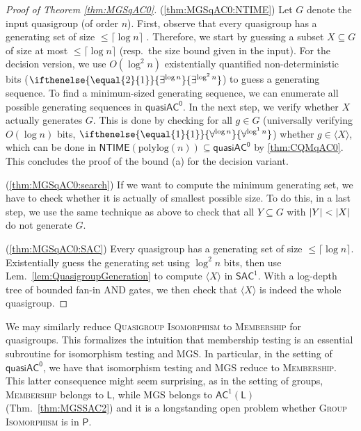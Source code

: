 \documentclass{theoretics}
\newcommand{\algprobm}[1]{\textsc{#1}\xspace}
\newcommand{\betacc}[1]{\ifthenelse{\equal{#1}{1}}{\exists^{\log n}}{\exists^{\log^{#1}n}}} %
\newcommand{\alphacc}[1]{\ifthenelse{\equal{#1}{1}}{\forall^{\log n}}{\forall^{\log^{#1}n}}} %
\newcommand{\abs}[1]{\left|\mathinner{#1}\right|}
\newcommand{\Lem}[1]{Lem.~\ref{#1}\xspace}
\newcommand{\Thm}[1]{Thm.~\ref{#1}\xspace}
\newcommand*{\ComplexityClass}[1]{\ensuremath{\mathsf{#1}}\xspace}
\newcommand*{\LogSpace}{\ComplexityClass{L}}
\newcommand{\SAC}{\ComplexityClass{SAC}}
\newcommand{\qACz}{\ComplexityClass{quasiAC^0}}
\newcommand{\NTIME}{\ComplexityClass{NTIME}}
\begin{document}
\begin{proof}[Proof of Theorem \ref{thm:MGSqAC0}]

(\ref{thm:MGSqAC0:NTIME}) Let $G$ denote the input quasigroup (of order $n$). First, observe that every quasigroup has a generating set of size $\leq \lceil \log n \rceil$ \cite{MillerTarjan}. Therefore, we start by guessing a subset $X\subseteq G$ of size at most $\leq \lceil \log n \rceil$ (resp.\ the size bound given in the input). For the decision version, we use $O(\log^2 n)$ existentially quantified non-deterministic bits ($\betacc{2}$) to guess a generating sequence. To find a minimum-sized generating sequence,  we can enumerate all possible generating sequences in $\qACz$. In the next step, we verify whether $X$ actually generates $G$. This is done by checking for all $g \in G$ (universally verifying $O(\log n)$ bits, $\alphacc{1}$) whether $g \in \langle X \rangle$, which can be done in $\NTIME(\mathrm{polylog}(n)) \subseteq \qACz$ by \cref{thm:CQMqAC0}. This concludes the proof of the bound (a) for the decision variant. 

(\ref{thm:MGSqAC0:search}) If we want to compute the minimum generating set, we have to check whether it is actually of smallest possible size. To do this, in a last step, we use the same technique as above to check that all $Y \subseteq G $ with $\abs{Y} < \abs{X}$ do not generate $G$.

(\ref{thm:MGSqAC0:SAC}) Every quasigroup has a generating set of size $\leq \lceil \log n \rceil$. Existentially guess the generating set using $\log^2 n$ bits, then use \Lem{lem:QuasigroupGeneration} to compute $\langle X \rangle$ in $\SAC^1$. With a log-depth tree of bounded fan-in AND gates, we then check that $\langle X \rangle$ is indeed the whole quasigroup. 
\end{proof}



\begin{remark}
We may similarly reduce \algprobm{Quasigroup Isomorphism} to \algprobm{Membership} for quasigroups. This formalizes the intuition that membership testing is an essential subroutine for isomorphism testing and \algprobm{MGS}. In particular, in the setting of $\qACz$, we have that isomorphism testing and \algprobm{MGS} reduce to \algprobm{Membership}. This latter consequence might seem surprising, as in the setting of groups, \algprobm{Membership} belongs to $\LogSpace$, while \algprobm{MGS} belongs to $\mathsf{AC}^{1}(\mathsf{L})$ (\Thm{thm:MGSSAC2}) and it is a longstanding open problem whether \algprobm{Group Isomorphism} is in $\mathsf{P}$.
\end{remark}
\fi
\end{document}
